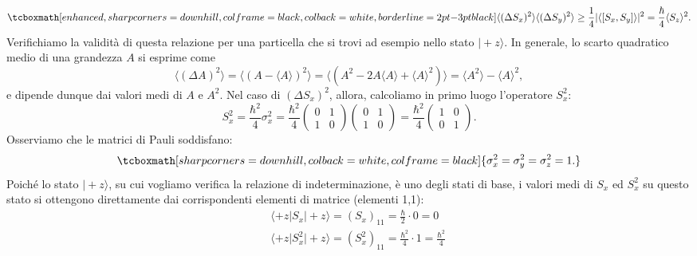 \documentclass[a4paper,12pt,oneside]{book}
\begin{document}
	\begin{equation}
		\label{eq:cap4_6}
		\tcboxmath[enhanced, sharp corners=downhill, colframe=black, colback=white, borderline={2pt}{-3pt}{black}]{
			\langle (\Delta S_x) ^2 \rangle \langle (\Delta S_y) ^2 \rangle \geq \frac{1}{4} \vert \langle \left[ S_x , S_y \right] \rangle \vert ^2 = \frac{\hbar}{4} \langle S_z \rangle ^2 .
			}
	\end{equation}
Verifichiamo la validità di questa relazione per una particella che si trovi ad esempio nello stato $\vert +z\rangle$. In generale, lo scarto quadratico medio di una grandezza $A$ si esprime come
	\begin{equation}
		\langle (\Delta A ) ^2 \rangle = \langle (A- \langle A \rangle ) ^2 \rangle = \langle (A^2-2A\langle A \rangle + \langle A \rangle ^2) \rangle = \langle A^2\rangle - \langle A \rangle ^2,
	\end{equation}
e dipende dunque dai valori medi di $A$ e $A^2$. Nel caso di $(\Delta S_x) ^2$, allora, calcoliamo in primo luogo l'operatore $S_x ^2$:
	\begin{equation}
		S_x ^2 = \frac{\hbar ^2}{4} \sigma _x ^2=\frac{\hbar ^2}{4} \begin{pmatrix}
		0 & 1 \\
		1 & 0
		\end{pmatrix} \begin{pmatrix}
		0 & 1 \\
		1 & 0
		\end{pmatrix} = \frac{\hbar ^2}{4}\begin{pmatrix}
		1 & 0 \\
		0 & 1
		\end{pmatrix}.
	\end{equation}
Osserviamo che le matrici di Pauli soddisfano:
	\begin{equation}
		\tcboxmath[sharp corners=downhill, colback=white, colframe=black]{
		\sigma _x ^2 = \sigma _y ^2 = \sigma _z ^2 =1.
		}
	\end{equation}
Poiché lo stato $\vert +z \rangle$, su cui vogliamo verifica la relazione di indeterminazione, è uno degli stati di base, i valori medi di $S_x$ ed $S_x ^2$ su questo stato si ottengono direttamente dai corrispondenti elementi di matrice (elementi 1,1):
	\begin{eqnarray}
		& &\displaystyle{\langle +z \vert S_x \vert +z \rangle = (S_x)_{11} = \frac{\hbar}{2}\cdot 0 =0}  \\
		& &\displaystyle{\langle +z \vert S_x ^2\vert +z \rangle = (S_x ^2)_{11} = \frac{\hbar ^2}{4}\cdot 1 =\frac{\hbar ^2}{4}} 
	\end{eqnarray}
\end{document}
